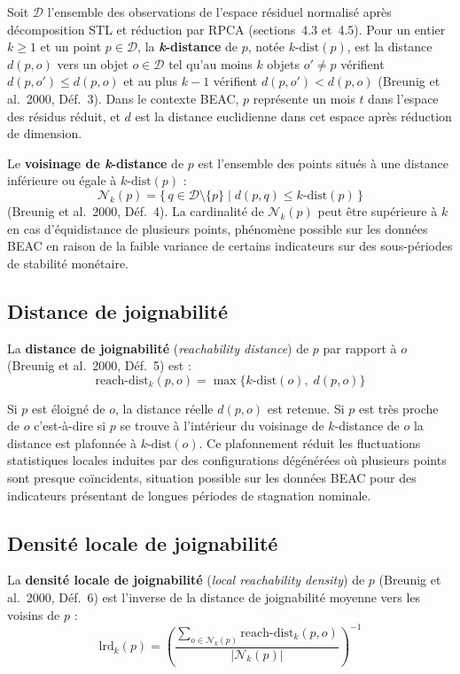 \documentclass[12pt,a4paper]{article}
\begin{document}
Soit $\mathcal{D}$ l'ensemble des observations de l'espace résiduel normalisé
après décomposition STL et réduction par RPCA (sections~4.3 et~4.5). Pour un
entier $k \geq 1$ et un point $p \in \mathcal{D}$, la \textbf{\textit{k}-distance}
de $p$, notée $k\text{-dist}(p)$, est la distance $d(p, o)$ vers un objet
$o \in \mathcal{D}$ tel qu'au moins $k$ objets $o' \neq p$ vérifient
$d(p, o') \leq d(p, o)$ et au plus $k-1$ vérifient $d(p, o') < d(p, o)$
(Breunig et al.\ 2000, Déf.~3). Dans le contexte BEAC, $p$ représente un
mois $t$ dans l'espace des résidus réduit, et $d$ est la distance euclidienne
dans cet espace après réduction de dimension.

Le \textbf{voisinage de \textit{k}-distance} de $p$ est l'ensemble des points
situés à une distance inférieure ou égale à $k\text{-dist}(p)$ :
$$\mathcal{N}_k(p) = \bigl\{\, q \in \mathcal{D} \setminus \{p\}
\mid d(p, q) \leq k\text{-dist}(p) \,\bigr\}$$
(Breunig et al.\ 2000, Déf.~4). La cardinalité de $\mathcal{N}_k(p)$ peut
être supérieure à $k$ en cas d'équidistance de plusieurs points, phénomène
possible sur les données BEAC en raison de la faible variance de certains
indicateurs sur des sous-périodes de stabilité monétaire.

\subsection{Distance de joignabilité}

La \textbf{distance de joignabilité} (\textit{reachability distance}) de $p$
par rapport à $o$ (Breunig et al.\ 2000, Déf.~5) est :
$$\mathrm{reach\text{-}dist}_k(p, o) = \max \bigl\{
k\text{-dist}(o),\; d(p, o)
\bigr\}$$

Si $p$ est éloigné de $o$, la distance réelle $d(p, o)$ est retenue. Si $p$
est très proche de $o$  c'est-à-dire si $p$ se trouve à l'intérieur du
voisinage de $k$-distance de $o$  la distance est plafonnée à
$k\text{-dist}(o)$. Ce plafonnement réduit les fluctuations statistiques
locales induites par des configurations dégénérées où plusieurs points sont
presque coïncidents, situation possible sur les données BEAC pour des
indicateurs présentant de longues périodes de stagnation nominale.

\subsection{Densité locale de joignabilité}

La \textbf{densité locale de joignabilité} (\textit{local reachability density})
de $p$ (Breunig et al.\ 2000, Déf.~6) est l'inverse de la distance de
joignabilité moyenne vers les voisins de $p$ :
$$\mathrm{lrd}_k(p) = \left(
\frac{\displaystyle\sum_{o \in \mathcal{N}_k(p)}
\mathrm{reach\text{-}dist}_k(p, o)}
{\left|\mathcal{N}_k(p)\right|}
\right)^{-1}$$
\end{document}
